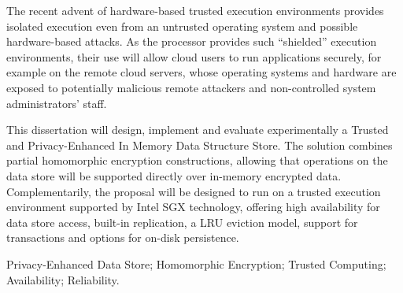 The recent advent of hardware-based trusted execution environments provides isolated execution even from an untrusted operating system and possible hardware-based attacks. As the processor provides such “shielded” execution environments, their use will allow cloud users to run applications securely, for example on the remote cloud servers, whose operating systems and hardware are exposed to potentially malicious remote attackers and non-controlled system administrators’ staff.

This dissertation will design, implement and evaluate experimentally a Trusted and Privacy-Enhanced In Memory Data Structure Store. The solution combines partial homomorphic encryption constructions, allowing that operations on the data store will be supported directly over in-memory encrypted data. Complementarily, the proposal will be designed to run on a trusted execution environment supported by Intel SGX technology, offering high availability for data store access, built-in replication, a LRU eviction model, support for transactions and options for on-disk persistence.

\begin{keywords}
Privacy-Enhanced Data Store; Homomorphic Encryption; Trusted Computing; Availability; Reliability.
\end{keywords} 
